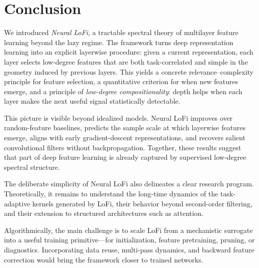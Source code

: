 \section{Conclusion}

\label{2605:sec:conclusions}
We introduced \emph{Neural LoFi}, a tractable spectral theory of multilayer feature learning beyond the lazy regime. The framework turns deep representation learning into an explicit layerwise procedure: given a current representation, each layer selects low-degree features that are both task-correlated and simple in the geometry induced by previous layers. This yields a concrete relevance--complexity principle for feature selection, a quantitative criterion for when new features emerge, and a principle of \emph{low-degree compositionality}: depth helps when each layer makes the next useful signal statistically detectable.

This picture is visible beyond idealized models. Neural LoFi improves over random-feature baselines, predicts the sample scale at which layerwise features emerge, aligns with early gradient-descent representations, and recovers salient convolutional filters without backpropagation. Together, these results suggest that part of deep feature learning is already captured by supervised low-degree spectral structure.

The deliberate simplicity of Neural LoFi also delineates a clear research program. Theoretically, it remains to understand the long-time dynamics of the task-adaptive kernels generated by LoFi, their behavior beyond second-order filtering, and their extension to structured architectures such as attention. 

Algorithmically, the main challenge is to scale LoFi from a mechanistic surrogate into a useful training primitive---for initialization, feature pretraining, pruning, or diagnostics. Incorporating data reuse, multi-pass dynamics, and backward feature correction would bring the framework closer to trained networks.
